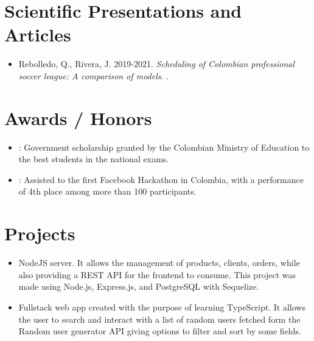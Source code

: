 \documentclass[]{rahulworld-resume}
\begin{document}
\begin{minipage}[t]{0.66\textwidth}
\section{Scientific Presentations and Articles}

\noindent
\begin{itemize}
    \item Rebolledo, Q., Rivera, J. 2019-2021. \textit{Scheduling of Colombian professional soccer league: A comparison of models}. \href{https://github.com/jamerrq/20192-Sport-Scheduling}{}.
\end{itemize}


\section{Awards / Honors}

\begin{itemize}
    \item {}: Government scholarship granted by the
    Colombian Ministry of Education to the best students in
    the national exams.
    \item {}: Assisted to the first Facebook Hackathon in Colombia,
    with a performance of 4th place among more than 100 participants.
\end{itemize}

\section{Projects}

\begin{itemize}
    \item \href{https://github.com/Ide-Pinturerias/pinturas-app-back}{} NodeJS server. It allows the management of products, clients, orders, while also providing a REST API for the frontend to consume. This project was made using Node.js, Express.js, and PostgreSQL with Sequelize.

    \item \href{https://github.com/jamerrq/wks-typescript}{} Fullstack web app created with the purpose of learning TypeScript. It allows the user to search and interact with a list of random users fetched form the Random user generator API giving options to filter and sort by some fields.  


\end{itemize}
\end{minipage}
\end{document}
